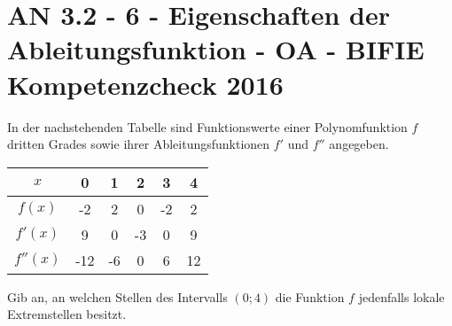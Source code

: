 \section{AN 3.2 - 6 - Eigenschaften der Ableitungsfunktion - OA - BIFIE Kompetenzcheck 2016}

\begin{beispiel}[AN 3.2]{1} %
				In der nachstehenden Tabelle sind Funktionswerte einer Polynomfunktion $f$ dritten Grades sowie ihrer Ableitungsfunktionen $f'$ und $f''$ angegeben.

\begin{center}
\begin{tabular}{|c|c|c|c|c|c|}\hline
$x$&0&1&2&3&4\\ \hline
$f(x)$&-2&2&0&-2&2\\ \hline
$f'(x)$&9&0&-3&0&9\\ \hline
$f''(x)$&-12&-6&0&6&12\\ \hline
\end{tabular}

\end{center}
Gib an, an welchen Stellen des Intervalls $\left(0;4\right)$ die Funktion $f$ jedenfalls lokale Extremstellen besitzt.


\end{beispiel}	